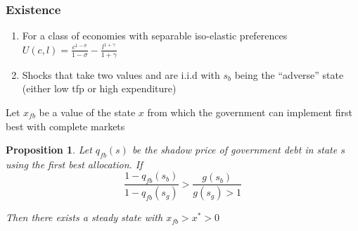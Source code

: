 \documentclass{beamer}
\newtheorem{proposition}{Proposition}
\begin{document}
 \begin{frame}
	\frametitle{Existence}
	
	\begin{enumerate}
	 \item For a class of economies with separable iso-elastic preferences
	 $U(c,l) = \frac{c^{1-\sigma}}{1-\sigma} -\frac{ l^{1+\gamma}}{1+\gamma}$
	 \item Shocks that take two values and are i.i.d with $s_b$  being the ``adverse'' state (either low tfp or high expenditure)
	\end{enumerate}

	
	Let $x_{fb}$ be a value of the state $x$ from which the government can implement first best with complete markets
	
	
	
	
	\begin{proposition}  Let $q_{fb}(s)$ be the shadow price of government debt in state $s$ using the first best allocation. 
	If 
	\[
		\frac{1-q_{fb}(s_b)}{1-q_{fb}(s_g)} > \frac{g(s_b)}{g(s_g)>1 }
	\] 
	
	Then there exists a steady state with $x_{fb}>x^*>0$
		\end{proposition}
\end{frame}


%
\end{document}
